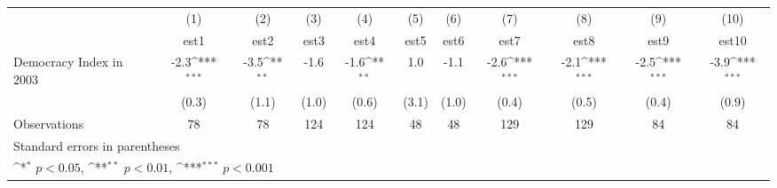 {
\def\sym#1{\ifmmode^{#1}\else\(^{#1}\)\fi}
\begin{tabular}{l*{10}{c}}
\hline\hline
                    &\multicolumn{1}{c}{(1)}         &\multicolumn{1}{c}{(2)}         &\multicolumn{1}{c}{(3)}         &\multicolumn{1}{c}{(4)}         &\multicolumn{1}{c}{(5)}         &\multicolumn{1}{c}{(6)}         &\multicolumn{1}{c}{(7)}         &\multicolumn{1}{c}{(8)}         &\multicolumn{1}{c}{(9)}         &\multicolumn{1}{c}{(10)}         \\
                    &        est1         &        est2         &        est3         &        est4         &        est5         &        est6         &        est7         &        est8         &        est9         &       est10         \\
\hline
Democracy Index in 2003&        -2.3\sym{***}&        -3.5\sym{**} &        -1.6         &        -1.6\sym{**} &         1.0         &        -1.1         &        -2.6\sym{***}&        -2.1\sym{***}&        -2.5\sym{***}&        -3.9\sym{***}\\
                    &       (0.3)         &       (1.1)         &       (1.0)         &       (0.6)         &       (3.1)         &       (1.0)         &       (0.4)         &       (0.5)         &       (0.4)         &       (0.9)         \\
\hline
Observations        &          78         &          78         &         124         &         124         &          48         &          48         &         129         &         129         &          84         &          84         \\
\hline\hline
\multicolumn{11}{l}{\footnotesize Standard errors in parentheses}\\
\multicolumn{11}{l}{\footnotesize \sym{*} \(p<0.05\), \sym{**} \(p<0.01\), \sym{***} \(p<0.001\)}\\
\end{tabular}
}
